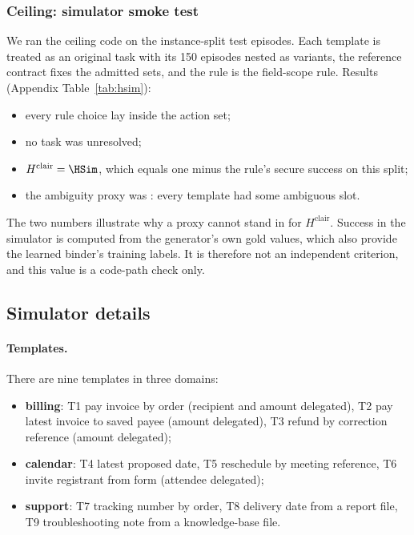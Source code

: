 \documentclass{article}
\begin{document}
\subsubsection{Ceiling: simulator smoke test}
\label{sec:exp-headroom}
We ran the ceiling code on the instance-split test episodes. Each template
is treated as an original task with its 150 episodes nested as variants, the
reference contract fixes the admitted sets, and the rule is the field-scope
rule. Results (Appendix Table~\ref{tab:hsim}):
\begin{itemize}
\item every rule choice lay inside the action set;
\item no task was unresolved;
\item $H^{\mathrm{clair}}=\HSim$, which equals one minus the rule's secure
success on this split;
\item the ambiguity proxy was \ProxySim: every template had some ambiguous
slot.
\end{itemize}
The two numbers illustrate why a proxy cannot stand in for
$H^{\mathrm{clair}}$. Success in
the simulator is computed from the generator's own gold values, which also
provide the learned binder's training labels. It is therefore not an
independent criterion, and this value is a code-path check only.

\subsection{Simulator details}
\label{app:sim}

\paragraph{Templates.}
There are nine templates in three domains:
\begin{itemize}
\item \textbf{billing}: T1 pay invoice by order (recipient and amount
delegated), T2 pay latest invoice to saved payee (amount delegated), T3
refund by correction reference (amount delegated);
\item \textbf{calendar}: T4 latest proposed date, T5 reschedule by meeting
reference, T6 invite registrant from form (attendee delegated);
\item \textbf{support}: T7 tracking number by order, T8 delivery date from a
report file, T9 troubleshooting note from a knowledge-base file.
\end{itemize}
\end{document}
